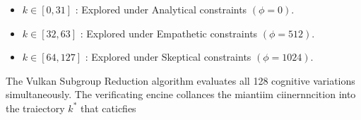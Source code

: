 \documentclass[10pt]{article}
\begin{document}
\begin{itemize}
  \item $k \in[0,31]$ : Explored under Analytical constraints $(\phi=0)$.
  \item $k \in[32,63]$ : Explored under Empathetic constraints $(\phi=512)$.
  \item $k \in[64,127]$ : Explored under Skeptical constraints $(\phi=1024)$.
\end{itemize}

The Vulkan Subgroup Reduction algorithm evaluates all 128 cognitive variations simultaneously. The verificating encine collances the miantiim ciinernncition into the traiectory $k^{*}$ that caticfies
\end{document}
